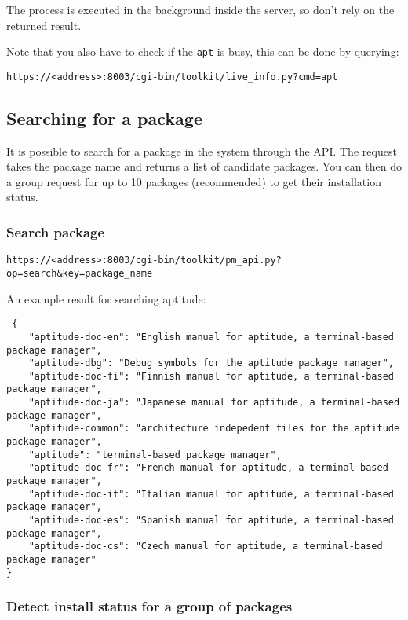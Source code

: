 \documentclass[12pt]{article}
\begin{document}
 The process is executed in the background inside the server, so don't rely on the returned result. 
 
 Note that you also have to check if the \texttt{apt} is busy, this can be done by querying:
 
 
 \texttt{https://<address>:8003/cgi-bin/toolkit/live\_info.py?cmd=apt}
 
 
 \subsection{Searching for a package}
 
 It is possible to search for a package in the system through the API. The request takes the package name and returns a list of candidate packages. You can then do a group request for up to 10 packages (recommended) to get their installation status.
 
 \subsubsection{Search package}
 
 \texttt{https://<address>:8003/cgi-bin/toolkit/pm\_api.py?op=search\&key=package\_name}
 
 
 An example result for searching aptitude:
 
 \begin{verbatim}
 {
    "aptitude-doc-en": "English manual for aptitude, a terminal-based package manager",
    "aptitude-dbg": "Debug symbols for the aptitude package manager",
    "aptitude-doc-fi": "Finnish manual for aptitude, a terminal-based package manager",
    "aptitude-doc-ja": "Japanese manual for aptitude, a terminal-based package manager",
    "aptitude-common": "architecture indepedent files for the aptitude package manager",
    "aptitude": "terminal-based package manager",
    "aptitude-doc-fr": "French manual for aptitude, a terminal-based package manager",
    "aptitude-doc-it": "Italian manual for aptitude, a terminal-based package manager",
    "aptitude-doc-es": "Spanish manual for aptitude, a terminal-based package manager",
    "aptitude-doc-cs": "Czech manual for aptitude, a terminal-based package manager"
}
\end{verbatim}
 

 \subsubsection{Detect install status for a group of packages}
 
\end{document}
